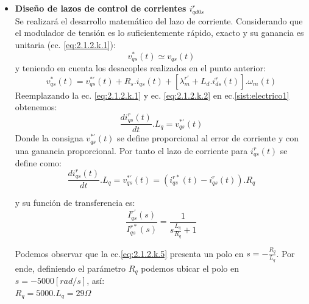 \documentclass[10pt]{article}
\begin{document}
\begin{itemize}
\item \textbf{Diseño de lazos de control de corrientes $i^{r}_{qd0s}$}\\
Se realizará el desarrollo matemático del lazo de corriente. Considerando que el modulador de tensión es lo suficientemente rápido, exacto y su ganancia es unitaria (ec. \ref{eq:2.1.2.k.1}):
	\begin{equation}
	v^{*}_{qs}(t)\simeq v_{qs}(t)
	\label{eq:2.1.2.k.1}
	\end{equation}
y teniendo en cuenta los desacoples realizados en el punto anterior:
	\begin{equation}
	v^{*}_{qs}(t)= v^{*'}_{qs}(t) + R_{s}. i_{qs}(t) + [\lambda^{r'}_{m}+L_{d}.i^{r}_{ds}(t)].\omega_{m}(t)
	\label{eq:2.1.2.k.2}
	\end{equation}
Reemplazando la ec. \ref{eq:2.1.2.k.1} y ec. \ref{eq:2.1.2.k.2} en ec.\ref{sist:electrico1} obtenemos:
\begin{equation}
	\frac{di^{r}_{qs}(t)}{dt} . L_{q}= v^{*'}_{qs}(t)
	\label{eq:2.1.2.k.3}
	\end{equation}
	Donde la consigna $v^{*'}_{qs}(t)$ se define proporcional al error de corriente y con una ganancia proporcional. Por tanto el lazo de corriente para $i^{r}_{qs}(t)$ se define como:
	\begin{equation}
	\frac{di^{r}_{qs}(t)}{dt} . L_{q}= v^{*'}_{qs}(t)=(i^{r*}_{qs}(t)-i^{r}_{qs}(t)).R_{q}
	\label{eq:2.1.2.k.4}
	\end{equation}
	
	y su función de transferencia es:
		\begin{equation}
	\frac{I^{r'}_{qs}(s)}{I^{r*}_{qs}(s)}=\frac{1}{s\frac{L_{q}}{R_{q}}+1}
	\label{eq:2.1.2.k.5}
	\end{equation}
	
	Podemos observar que la ec.\ref{eq:2.1.2.k.5} presenta un polo en $s=-\frac{R_{q}}{L_{q}}$. Por ende, definiendo el parámetro $R_{q}$ podemos ubicar el polo en $s=-5000[rad/s]$, así:\\
	$R_{q}=5000 . L_{q}=29\Omega$
	

\end{itemize}
\end{document}
